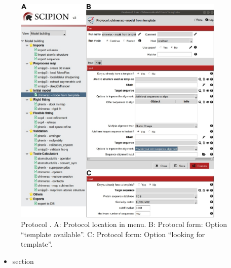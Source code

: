 \begin{itemize}
            \begin{figure}[H]
                \centering 
                \captionsetup{width=.7\linewidth} 
                \includegraphics[width=0.90\textwidth]{Images_appendix/Fig111.pdf}
                \caption{Protocol . A: Protocol location in \scipion menu. B: Protocol form: Option ``template available''. C: Protocol form: Option ``looking for template''.}
                \label{fig:app_protocol_seqHomology_1}
            \end{figure}
            
            \begin{itemize}
                    \item {} section
  


\end{itemize}
\end{itemize}
